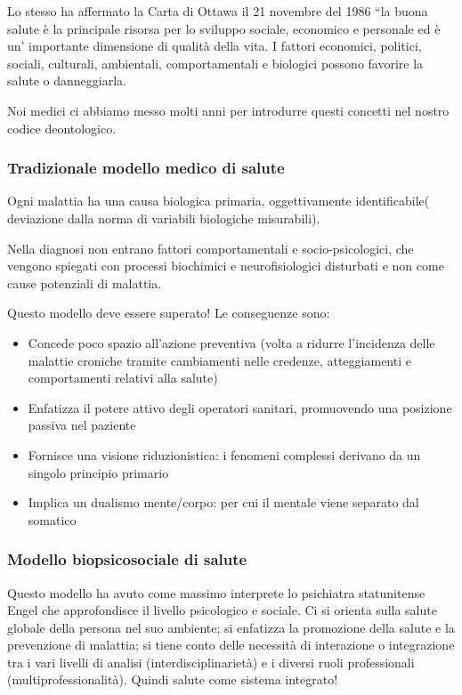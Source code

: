   Lo stesso ha affermato la Carta di Ottawa il 21 novembre del 1986 ``la
  buona salute è la principale risorsa per lo sviluppo sociale,
  economico e personale ed è un' importante dimensione di qualità della
  vita. I fattori economici, politici, sociali, culturali, ambientali,
  comportamentali e biologici possono favorire la salute o danneggiarla.

  Noi medici ci abbiamo messo molti anni per introdurre questi concetti
  nel nostro codice deontologico.

  \subsubsection{Tradizionale modello medico di salute}
  
  Ogni malattia ha una causa biologica primaria, oggettivamente
  identificabile( deviazione dalla norma di variabili biologiche
  misurabili).

  Nella diagnosi non entrano fattori comportamentali e
  socio-psicologici, che vengono spiegati con processi biochimici e
  neurofisiologici disturbati e non come cause potenziali di malattia.

  Questo modello deve essere superato! Le conseguenze sono:
  
\begin{itemize}
\item
  Concede poco spazio all'azione preventiva (volta a ridurre l'incidenza
  delle malattie croniche tramite cambiamenti nelle credenze,
  atteggiamenti e comportamenti relativi alla salute)
\item
  Enfatizza il potere attivo degli operatori sanitari, promuovendo una
  posizione passiva nel paziente
\item
  Fornisce una visione riduzionistica: i fenomeni complessi derivano da
  un singolo principio primario
\item
  Implica un dualismo mente/corpo: per cui il mentale viene separato dal
  somatico
\end{itemize}

  \subsubsection{Modello biopsicosociale di salute}

  Questo modello ha avuto come massimo interprete lo psichiatra
  statunitense Engel che approfondisce il livello psicologico e sociale.
  Ci si orienta sulla salute globale della persona nel suo ambiente; si
  enfatizza la promozione della salute e la prevenzione di malattia; si
  tiene conto delle necessità di interazione o integrazione tra i vari
  livelli di analisi (interdisciplinarietà) e i diversi ruoli
  professionali (multiprofessionalità). Quindi salute come sistema
  integrato!

